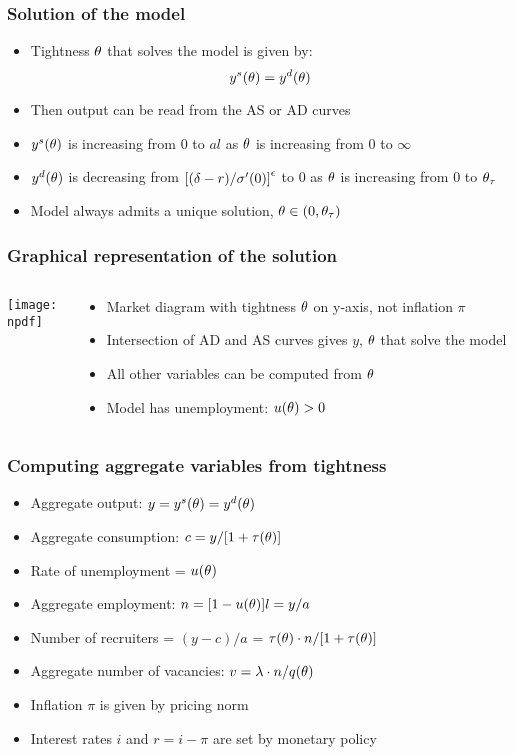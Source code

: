 \documentclass[11pt,aspectratio=169,xcolor={dvipsnames},hyperref={pdftex,pdfpagemode=UseNone,hidelinks,pdfdisplaydoctitle=true},usepdftitle=false]{beamer}
\newcommand{\npdf}{../figures/figures3.pdf}
\begin{document}
\begin{frame}
\end{frame}


\begin{frame}
\frametitle{Solution of the model}
\begin{itemize}
\item Tightness $\theta$ that solves the model is given by:
\begin{equation*}
y^s(\theta) = y^d(\theta)
\end{equation*}
\item Then output can be read from the AS or AD curves
\item $y^s(\theta)$ is increasing from $0$ to $al$ as $\theta$ is increasing from 0 to $\infty$
\item $y^d(\theta)$ is decreasing from $\left[ (\delta - r)/\sigma'(0) \right]^{\epsilon}$ to $0$ as $\theta$ is increasing from 0 to $\theta_{\tau}$
\item[\then] Model always admits a unique solution, $\theta \in (0,\theta_{\tau})$
\end{itemize}	
\end{frame}

\begin{frame}
\frametitle{Graphical representation of the solution}
\begin{columns}
\begin{column}{0.6\textwidth}
\texttt{[image: \\npdf]}%
\end{column}
\begin{column}{0.4\textwidth}
\begin{itemize}
	\item Market diagram with tightness $\theta$ on y-axis, not inflation $\pi$
	\item Intersection of AD and AS curves gives $y$, $\theta$ that solve the model
	\item All other variables can be computed from $\theta$
	\item Model has unemployment: $u(\theta)>0$
\end{itemize}
\end{column}
\end{columns} 
\end{frame}

\begin{frame}
\frametitle{Computing aggregate variables from tightness}
\begin{itemize}
\item Aggregate output: $y = y^s(\theta) = y^d(\theta)$
\item Aggregate consumption: $c = y/[1+\tau(\theta)]$
\item Rate of unemployment = $u(\theta)$
\item Aggregate employment: $n = [1-u(\theta)] l = y/a$
\item Number of recruiters = $(y-c)/a$ = $\tau(\theta) \cdot  n /[1+\tau(\theta)]$
\item Aggregate number of vacancies: $v = \lambda\cdot n/q(\theta)$
\item Inflation $\pi$ is given by pricing norm
\item Interest rates $i$ and $r = i-\pi$ are set by monetary policy
\end{itemize}	
\end{frame}
\end{document}

